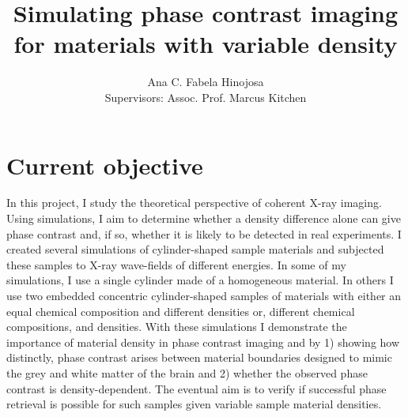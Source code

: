 \documentclass[9pt, a4paper]{article}
\title{Simulating phase contrast imaging for materials with variable density}
\author{Ana C. Fabela Hinojosa \\
\small{Supervisors: Assoc. Prof. Marcus Kitchen}}
\begin{document}
\maketitle
\section{Current objective}

In this project, I study the theoretical perspective of coherent X-ray imaging. Using simulations, I aim to determine whether a density difference alone can give phase contrast and, if so, whether it is likely to be detected in real experiments. I created several simulations of cylinder-shaped sample materials and subjected these samples to X-ray wave-fields of different energies. In some of my simulations, I use a single cylinder made of a homogeneous material. In others I use two embedded concentric cylinder-shaped samples of materials with either an equal chemical composition and different densities or, different chemical compositions, and densities. 
With these simulations I demonstrate the importance of material density in phase contrast imaging and by 1) showing how distinctly, phase contrast arises between material boundaries designed to mimic the grey and white matter of the brain and 2) whether the observed phase contrast is density-dependent. The eventual aim is to verify if successful phase retrieval is possible for such samples given variable sample material densities.
\end{document}
